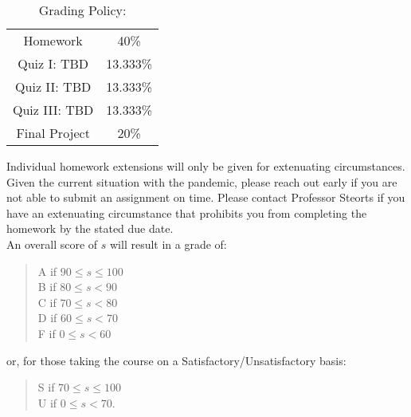 \documentclass[11pt]{article}
\begin{document}
\begin{table}[h!]
\caption{Grading Policy:}
\begin{center}
\begin{tabular}{cc}
Homework &40\%\\
Quiz I:  TBD &13.333\%\\
Quiz II: TBD & 13.333\%\\
Quiz III: TBD & 13.333\%\\
Final Project &20\%\\
\end{tabular}
\end{center}
\label{default}
\end{table}%


Individual homework extensions will only be given for extenuating circumstances. Given the current situation with the pandemic, please reach out early if you are not able to submit an assignment on time. Please contact Professor Steorts if you have an extenuating circumstance that prohibits you from completing the homework by the stated due date.\\


An overall score of $s$ will result in a grade of:
\begin{quote}
A if $90\leq s\leq 100$ \\
B if $80\leq s < 90$ \\
C if $70\leq s < 80$ \\
D if $60\leq s < 70$ \\
F if $0\leq s < 60$
\end{quote}
or, for those taking the course on a Satisfactory/Unsatisfactory basis:
\begin{quote}
S if $70\leq s\leq 100$ \\
U if $0\leq s < 70$.
\end{quote}
\end{document}
